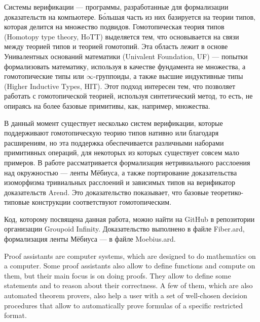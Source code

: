




\Annot

Системы верификации --- программы, разработанные для формализации доказательств на компьютере. Б\'{о}льшая часть из них базируется на теории типов, которая делится на множество подвидов.
Гомотопическая теория типов (Homotopy type theory, HoTT) выделяется тем, что основывается на связи между теорией типов и теорией гомотопий. Эта область лежит в основе Унивалентных оснований математики (Univalent Foundation, UF) --- попытки формализовать математику, используя в качестве фундамента не множества, а гомотопические типы или $\infty$-группоиды, а также высшие индуктивные типы (Higher Inductive Types, HIT). Этот подход интересен тем, что позволяет работать с гомотопической теорией, используя синтетический метод, то есть, не опираясь на более базовые примитивы, как, например, множества.

В данный момент существует несколько систем верификации, которые поддерживают гомотопическую теорию типов нативно или благодаря расширениям, но эта поддержка обеспечивается различными наборами примитивных операций, для некоторых из которых существует совсем мало примеров.
В работе рассматривается формализация нетривиального расслоения над окружностью --- ленты Мёбиуса, а также портирование доказательства изоморфизма тривиальных расслоений и зависимых типов на верификатор доказательств Arend. Это доказательство показывает, что базовые теоретико-типовые конструкции соответствуют гомотопическим.

Код, которому посвящена данная работа, можно найти на GitHub\autocite{Grp1} в репозитории организации Groupoid Infinity. Доказательство выполнено в файле Fiber.ard\autocite{Fiber}, формализация ленты Мёбиуса --- в файле Moebius.ard\autocite{Moebius}.

\Introduction

Proof assistants are computer systems, which are designed to do mathematics on a computer. Some proof assistants also allow to define functions and compute on them, but their main focus is on doing proofs. They allow to define some statements and to reason about their correctness. A few of them, which are also automated theorem provers, also help a user with a set of well-chosen decision procedures that allow to automatically prove formulas of a specific restricted format\autocite{ProofAssistants1}.

